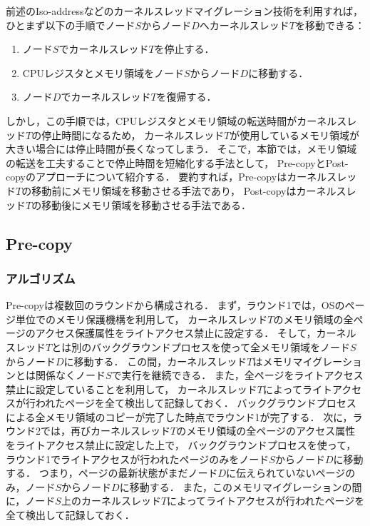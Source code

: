 \documentclass[10pt]{jsarticle}
\begin{document}
前述のIso-addressなどのカーネルスレッドマイグレーション技術を利用すれば，
ひとまず以下の手順でノード$S$からノード$D$へカーネルスレッド$T$を移動できる：
\begin{enumerate}
\item ノード$S$でカーネルスレッド$T$を停止する．
\item CPUレジスタとメモリ領域をノード$S$からノード$D$に移動する．
\item ノード$D$でカーネルスレッド$T$を復帰する．
\end{enumerate}

しかし，この手順では，CPUレジスタとメモリ領域の転送時間がカーネルスレッド$T$の停止時間になるため，
カーネルスレッド$T$が使用しているメモリ領域が大きい場合には停止時間が長くなってしまう．
そこで，本節では，メモリ領域の転送を工夫することで停止時間を短縮化する手法として，
Pre-copy\cite{t2}とPost-copy\cite{t1}のアプローチについて紹介する．
要約すれば，Pre-copyはカーネルスレッド$T$の移動前にメモリ領域を移動させる手法であり，
Post-copyはカーネルスレッド$T$の移動後にメモリ領域を移動させる手法である．

\subsection{Pre-copy}

\subsubsection{アルゴリズム}

Pre-copyは複数回のラウンドから構成される．
まず，ラウンド1では，OSのページ単位でのメモリ保護機構を利用して，
カーネルスレッド$T$のメモリ領域の全ページのアクセス保護属性をライトアクセス禁止に設定する．
そして，カーネルスレッド$T$とは別のバックグラウンドプロセスを使って全メモリ領域をノード$S$からノード$D$に移動する．
この間，カーネルスレッド$T$はメモリマイグレーションとは関係なくノード$S$で実行を継続できる．
また，全ページをライトアクセス禁止に設定していることを利用して，
カーネルスレッド$T$によってライトアクセスが行われたページを全て検出して記録しておく．
バックグラウンドプロセスによる全メモリ領域のコピーが完了した時点でラウンド1が完了する．
次に，ラウンド2では，再びカーネルスレッド$T$のメモリ領域の全ページのアクセス属性をライトアクセス禁止に設定した上で，
バックグラウンドプロセスを使って，ラウンド1でライトアクセスが行われたページのみをノード$S$からノード$D$に移動する．
つまり，ページの最新状態がまだノード$D$に伝えられていないページのみ，ノード$S$からノード$D$に移動する．
また，このメモリマイグレーションの間に，ノード$S$上のカーネルスレッド$T$によってライトアクセスが行われたページを全て検出して記録しておく．
\end{document}
